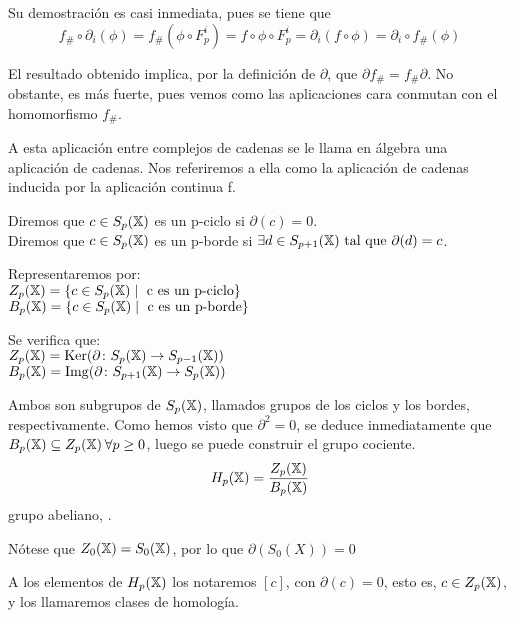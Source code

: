 Su demostración es casi inmediata, pues se tiene que \[ f_\# \circ \partial_i(\phi) = f_\#(\phi \circ F_p^i) = f \circ \phi \circ F_p^i
                                             = \partial_i(f \circ \phi) = \partial_i \circ f_\#(\phi) \]

El resultado obtenido implica, por la definición de $\partial$, que $\partial f_\# = f_\# \partial$. No obstante, es más fuerte, pues vemos
como las aplicaciones cara conmutan con el homomorfismo $f_\#$.

A esta aplicación entre complejos de cadenas se le llama en álgebra una aplicación de cadenas. Nos referiremos a ella como la aplicación de cadenas
inducida por la aplicación continua f.

\begin{definition}
  Diremos que $c \in S_p({\mathbb X})$ es un p-ciclo si $\partial(c) = 0$. \\
  Diremos que $c \in S_p({\mathbb X})$ es un p-borde si $\exists d \in S_{p+1}({\mathbb X}) \text{ tal que } \partial(d) = c$.
\end{definition}


Representaremos por: \\
$Z_p({\mathbb X}) = \{c \in S_p({\mathbb X}) \mid \text{ c es un p-ciclo}\}$ \\
$B_p({\mathbb X}) = \{c \in S_p({\mathbb X}) \mid \text{ c es un p-borde}\} $

Se verifica que: \\
$Z_p({\mathbb X}) = \operatorname{Ker} (\partial \colon S_p({\mathbb X}) \to S_{p-1}({\mathbb X})) $ \\
$B_p({\mathbb X}) = \operatorname{Img} (\partial \colon S_{p+1}({\mathbb X}) \to S_p({\mathbb X})) $

Ambos son subgrupos de $S_p({\mathbb X})$, llamados grupos de los ciclos y los bordes, respectivamente. Como hemos visto que $\partial^2 = 0$, se deduce
inmediatamente que $B_p({\mathbb X}) \subseteq Z_p({\mathbb X}) \hspace{0.2em}\forall p \geq 0$, luego se puede construir el grupo cociente.
\begin{equation*}
  H_p({\mathbb X}) = \frac{\displaystyle Z_p({\mathbb X})}{\displaystyle B_p({\mathbb X})}
\end{equation*}
grupo abeliano, \underline{}.

\begin{remark}
  Nótese que $Z_0({\mathbb X}) = S_0({\mathbb X})$, por lo que $\partial(S_0(X)) = 0$
\end{remark}

A los elementos de $H_p({\mathbb X})$ los notaremos $[c]$, con $\partial(c) = 0$, esto es, $c \in Z_p({\mathbb X})$, y los llamaremos clases de homología.

